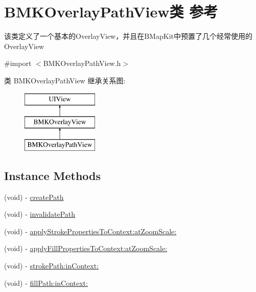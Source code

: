\hypertarget{interface_b_m_k_overlay_path_view}{\section{B\+M\+K\+Overlay\+Path\+View类 参考}
\label{interface_b_m_k_overlay_path_view}
}


该类定义了一个基本的\+Overlay\+View，并且在\+B\+Map\+Kit中预置了几个经常使用的\+Overlay\+View  




{\ttfamily \#import $<$B\+M\+K\+Overlay\+Path\+View.\+h$>$}

类 B\+M\+K\+Overlay\+Path\+View 继承关系图\+:\begin{figure}[H]
\begin{center}
\leavevmode
\includegraphics[height=3.000000cm]{interface_b_m_k_overlay_path_view}
\end{center}
\end{figure}
\subsection*{Instance Methods}
\begin{DoxyCompactItemize}
\item 
(void) -\/ \hyperlink{interface_b_m_k_overlay_path_view_a4e76c3b9524b555c2118ae18f6057605}{create\+Path}
\item 
(void) -\/ \hyperlink{interface_b_m_k_overlay_path_view_ac773bae0823405dcf5b78a3361fa2d56}{invalidate\+Path}
\item 
(void) -\/ \hyperlink{interface_b_m_k_overlay_path_view_a2acbf6bd9401c2904148b7b6cf85c6e9}{apply\+Stroke\+Properties\+To\+Context\+:at\+Zoom\+Scale\+:}
\item 
(void) -\/ \hyperlink{interface_b_m_k_overlay_path_view_af549bea37a94164a088826f9a962e08c}{apply\+Fill\+Properties\+To\+Context\+:at\+Zoom\+Scale\+:}
\item 
(void) -\/ \hyperlink{interface_b_m_k_overlay_path_view_a482e5fe24f04335d090b32d449ef6dc4}{stroke\+Path\+:in\+Context\+:}
\item 
(void) -\/ \hyperlink{interface_b_m_k_overlay_path_view_a036abde24b9ae921f209cde884dad49b}{fill\+Path\+:in\+Context\+:}
\end{DoxyCompactItemize}
